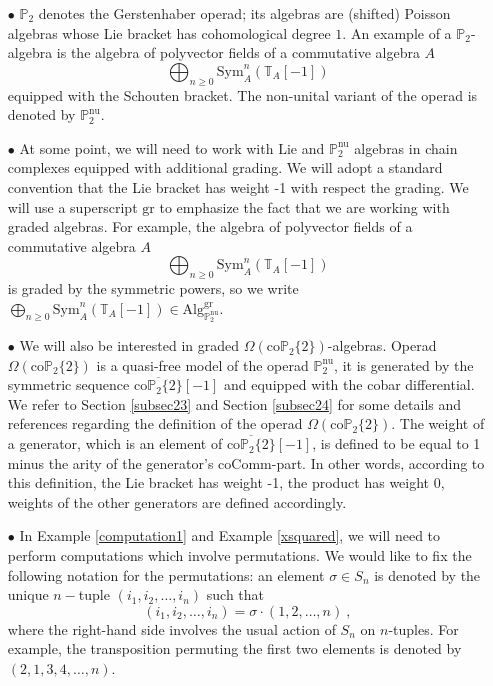 \documentclass[10pt, oneside]{amsart}
\theoremstyle{plain}
\newcommand{\alg}{\mathrm{Alg}}
\newcommand{\ccomm}{\mathrm{coComm}}
\newcommand{\gr}{\mathrm{gr}}
\newcommand{\lie}{\mathrm{Lie}}
\renewcommand{\nu}{\mathrm{nu}}
\newcommand{\PP}{\mathbb{P}}
\newcommand{\s}{\sigma}
\newcommand{\sym}{\mathrm{Sym}}
\newcommand{\TT}{\mathbb{T}}
\newcommand{\coP}{\mathrm{co}\PP}
\begin{document}
\begin{enumerate}
\item[$\bullet$] $\PP_2$ denotes the Gerstenhaber operad; its algebras are (shifted) Poisson algebras whose Lie bracket has 
cohomological degree $1$. An example of a $\PP_2$-algebra is the algebra of polyvector fields of a commutative algebra $A$
\begin{equation*}
\bigoplus_{n \ge 0} \sym_A^n (\TT_A[-1])
\end{equation*}
equipped with the Schouten bracket. The non-unital variant of the operad is denoted by $\PP_2^\text{nu}$.

\item[$\bullet$] At some point, we will need to work with $\lie$ and $\PP_2^\text{nu}$ algebras in chain complexes equipped with
additional grading. We will adopt a standard convention that the Lie bracket has weight -1 with respect the grading. We will use a
superscript $\mathrm{gr}$ to emphasize the fact that we are working with graded algebras.
For example, the algebra of polyvector fields 
of a commutative algebra $A$
\begin{equation*}
\bigoplus_{n \ge 0} \sym_A^n (\TT_A[-1])
\end{equation*}
is graded by the symmetric powers, so we write $\bigoplus_{n \ge 0} \sym_A^n (\TT_A[-1]) \in \alg^\gr_{\PP^\text{nu}_2}$.

\item[$\bullet$] We will also be interested in graded $\Omega(\coP_2\{2\})$-algebras. Operad $\Omega(\coP_2\{2\})$ is a quasi-free
model of the operad $\PP_2^\nu$, it is generated by the symmetric sequence $\overline{\coP_2\{2\}}[-1]$ and equipped with the cobar 
differential. We refer to Section \ref{subsec23} and Section \ref{subsec24} for some details and references
regarding the definition of the operad $\Omega(\coP_2\{2\})$. The weight of a generator, which is an element of
$\overline{\coP_2\{2\}}[-1]$, is defined to be equal to 1 minus the arity of the generator's $\ccomm$-part. In other words,
according to this definition, the Lie bracket has weight -1, the product has weight 0, weights of the other generators are defined
accordingly.

\item[$\bullet$] In Example \ref{computation1} and Example \ref{xsquared}, we will need to perform computations which involve
permutations. We would like to fix the following notation for the permutations: an element $\s \in S_n$ is denoted by the unique
$n-$tuple $(i_1, i_2, \ldots, i_n)$ such that
\begin{equation*}
(i_1, i_2, \ldots, i_n) = \s \cdot (1, 2, \ldots, n) \:,
\end{equation*}
where the right-hand side involves the usual action of $S_n$ on $n$-tuples.
For example, the transposition permuting the first two elements is denoted by $(2, 1, 3, 4, \ldots, n)$.


\end{enumerate}
\end{document}
